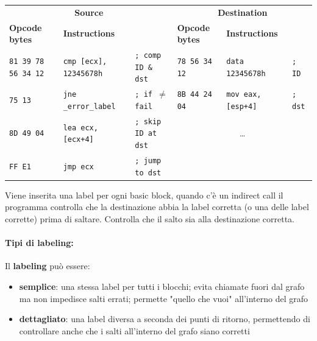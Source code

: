 \begin{table}[h]
	\centering
	\begin{adjustbox}{max width=\textwidth}
	\begin{tabular}{@{} lll | lll @{}}
		\multicolumn{3}{c}{\bfseries Source} & \multicolumn{3}{c}{\bfseries Destination} \\
		\cmidrule(lr){1-3} \cmidrule(l){4-6}
		\bfseries Opcode bytes & \bfseries Instructions &
		& \bfseries Opcode bytes & \bfseries Instructions &\\
		\midrule
		\texttt{81 39 78 56 34 12}
		& \texttt{cmp [ecx],\,12345678h} & \texttt{; comp ID \& dst}
		& \texttt{78 56 34 12} & \texttt{data 12345678h} & \texttt{; ID} \\
		\texttt{75 13}
		& \texttt{jne \_error\_label} & \texttt{; if \(\neq\) fail}
		& \texttt{8B 44 24 04} & \texttt{mov eax, [esp+4]} & \texttt{; dst} \\
		\texttt{8D 49 04}
		& \texttt{lea ecx,[ecx+4]} & \texttt{; skip ID at dst}
		& \multicolumn{3}{c}{\dots} \\
		\texttt{FF E1}
		& \texttt{jmp ecx} & \texttt{; jump to dst}
		& & & \\
	\end{tabular}
	\end{adjustbox}
\end{table}

Viene inserita una label per ogni basic block, quando c'è un indirect call il programma controlla che la destinazione abbia la label corretta (o una delle label corrette) prima di saltare. Controlla che il salto sia alla destinazione corretta.\\

\newpage

\paragraph{Tipi di labeling:} Il \textbf{labeling} può essere: 
\begin{itemize}
	\item \textbf{semplice}: una stessa label per tutti i blocchi; evita chiamate fuori dal grafo ma non impedisce salti errati; permette "quello che vuoi" all'interno del grafo
	\item \textbf{dettagliato}: una label diversa a seconda dei punti di ritorno, permettendo di controllare anche che i salti all'interno del grafo siano corretti
\end{itemize}

